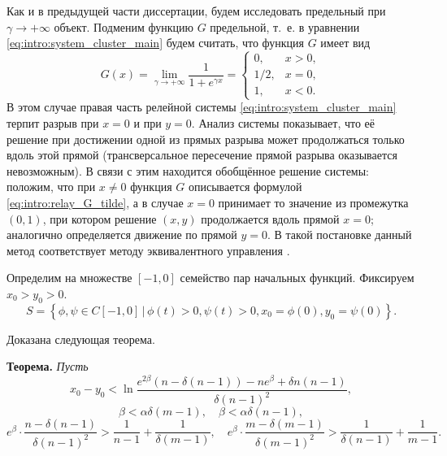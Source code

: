 Как и в предыдущей части диссертации, будем исследовать предельный при $\gamma \to +\infty$ объект. Подменим функцию $G$ предельной, т.~е. в уравнении \eqref{eq:intro:system_cluster_main} будем считать, что функция $G$ имеет вид 
\begin{equation}
	\label{eq:intro:relay_G_tilde}
	G(x) = \lim\limits_{\gamma \to +\infty} \dfrac{1}{1 + e^{\gamma x}} = 
	\begin{cases}
		0, & x > 0,\\
		1/2, & x = 0,\\
		1, & x < 0.
	\end{cases}
\end{equation}
%
В этом случае правая часть релейной системы \eqref{eq:intro:system_cluster_main} терпит разрыв при $x = 0$ и при $y = 0$. Анализ системы показывает, что её решение при достижении одной из прямых разрыва может продолжаться только вдоль этой прямой (трансверсальное пересечение прямой разрыва оказывается невозможным). В связи с этим находится обобщённое решение системы: положим, что при $x \neq 0$ функция $G$ описывается формулой \eqref{eq:intro:relay_G_tilde}, а в случае $x = 0$ принимает то значение из промежутка $(0, 1)$, при котором решение $(x, y)$ продолжается вдоль прямой $x = 0$; аналогично определяется движение по прямой $y = 0$. В такой постановке данный метод соответствует методу эквивалентного управления \cite{Utkin1981}. %


Определим на множестве $[-1, 0]$ семейство пар начальных функций. Фиксируем $x_0 > y_0 > 0$.
\begin{equation}
	\label{eq:intro:initial_set}
	S = \left\{\phi, \psi \in C[-1, 0] \,|\, \phi(t) > 0, \psi(t) > 0, x_0 = \phi(0), y_0 = \psi(0)\right\}.
\end{equation}

Доказана следующая теорема.

\bigskip

\textbf{Теорема.}
\textit{Пусть}
%
\begin{equation}
	\label{eq:intro:constraint_1}
	x_0 - y_0 < \ln \dfrac{e^{2\beta}(n - \delta(n - 1)) - ne^{\beta} + \delta n(n - 1)}{\delta (n - 1)^2},
\end{equation}
\begin{equation}
	\label{eq:intro:constraint_2}
	\beta < \alpha \delta (m - 1), \quad \beta < \alpha \delta (n - 1),
\end{equation}
\small
\begin{equation}
	\label{eq:intro:constraint_3}
	e^{\beta} \cdot \dfrac{n - \delta(n - 1)}{\delta (n - 1)^2} > \dfrac{1}{n - 1} + \dfrac{1}{\delta(m - 1)}, \quad
	e^{\beta} \cdot \dfrac{m - \delta(m - 1)}{\delta (m - 1)^2} > \dfrac{1}{\delta(n - 1)} + \dfrac{1}{m - 1}.
\end{equation}
\normalsize

